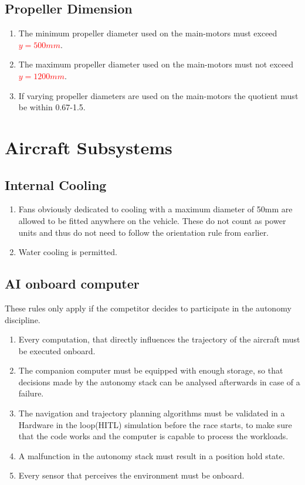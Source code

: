 \documentclass{article}
\begin{document}
\subsection{Propeller Dimension}
\begin{enumerate}
  \item The minimum propeller diameter used on the main-motors must exceed \textcolor{red}{$y=500mm$}.
  \item The maximum propeller diameter used on the main-motors must not exceed \textcolor{red}{$y=1200mm$}.
  \item If varying propeller diameters are used on the main-motors the quotient must be within 0.67-1.5.
\end{enumerate}





\section{Aircraft Subsystems}

\subsection{Internal Cooling}
\begin{enumerate}
  \item Fans obviously dedicated to cooling with a maximum diameter of 50mm are allowed to be fitted anywhere on the vehicle. These do not count as power units and thus do not need to follow the orientation rule from earlier.
  \item Water cooling is permitted. 
\end{enumerate}

\subsection{AI onboard computer}
These rules only apply if the competitor decides to participate in the autonomy discipline.
\begin{enumerate}
  \item Every computation, that directly influences the trajectory of the aircraft must be executed onboard.
  \item The companion computer must be equipped with enough storage, so that decisions made by the autonomy stack can be analysed afterwards in case of a failure. 
  \item The navigation and trajectory planning algorithms must be validated in a Hardware in the loop(HITL) simulation before the race starts, to make sure that the code works and the computer is capable to process the workloads.
  \item A malfunction in the autonomy stack must result in a position hold state. 
  \item Every sensor that perceives the environment must be onboard.
\end{enumerate}
\end{document}
